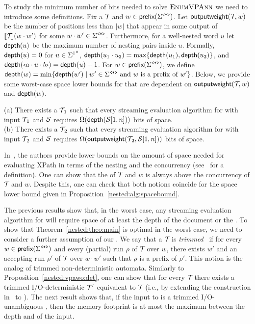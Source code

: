 To study the minimum number of bits needed to solve $\textsc{EnumVPAnn}$ we need to introduce some definitions.
Fix a \vpann $\mathcal{T}\!$ and $w \in \textsf{prefix}(\Sigma^{\texttt{<*>}})$. Let 
$\mathsf{outputweight}(\mathcal{T}\!, w)$ be the number of positions less than $|w|$ that appear in some output of ${\llbracket{\mathcal{T}\!}\rrbracket}(w\cdot w')$ for some $w\cdot w'\in \Sigma^{\texttt{<*>}}$. 
Furthermore, for a well-nested word $u$ let $\mathsf{depth}(u)$ be the maximum number of nesting pairs inside $u$. Formally, $\mathsf{depth}(u) = 0$ for $u \in  {\Sigma^{\texttt{|}}}^*$, $\mathsf{depth}(u_1 \cdot u_2) = \max\{\mathsf{depth}(u_1), \mathsf{depth}(u_2)\}$, and $\mathsf{depth}({\scriptsize\texttt{<}} a\cdot u\cdot b{\scriptsize\texttt{>}}) = \mathsf{depth}(u) + 1$. For $w \in \textsf{prefix}(\Sigma^{\texttt{<*>}})$, we define $\mathsf{depth}(w) = \min\{\mathsf{depth}(w') \mid w'\in \Sigma^{\texttt{<*>}} \text{ and } w \text{ is a prefix of } w'\}$.
Below, we provide some worst-case space lower bounds for \enumvpann{} that are dependent on $\mathsf{outputweight}(\mathcal{T}\!, w)$ and $\mathsf{depth}(w)$.
\begin{proposition}\label{nested:alg:spacebound} (a) There exists a \vpann $\mathcal{T}\!_1$ such that every streaming evaluation algorithm for \enumvpann{} with input $\mathcal{T}\!_1$ and $\mathcal{S}$ requires $\Omega(\mathsf{depth}(\mathcal{S}[1, n]))$ bits of space.\\ (b) There exists a \vpann $\mathcal{T}\!_2$ such that every streaming evaluation algorithm for \enumvpann{} with input $\mathcal{T}\!_2$ and $\mathcal{S}$ requires $\Omega(\mathsf{outputweight}(\mathcal{T}\!_2, \mathcal{S}[1, n]))$ bits of space.
\end{proposition}



In~\cite{BarYossefFJ05,BarYossefFJ07}, the authors provide lower bounds on the amount of space needed for evaluating XPath in terms of the nesting and the concurrency (see~\cite{BarYossefFJ05} for a definition). 
One can show that  the \ogapname of $\mathcal{T}\!$ and $w$ is always above the concurrency of $\mathcal{T}\!$ and $w$. Despite this, one can check that both notions coincide for the space lower bound given in Proposition~\ref{nested:alg:spacebound}.

The previous results show that, in the worst case, any streaming evaluation algorithm for \vpann will require space of at least the depth of the document or the \ogapname.
To show that Theorem~\ref{nested:theo:main} is optimal in the worst-case, we need to consider a further assumption of our \vpann. We say that a \vpann $\mathcal{T}\!$ is \emph{trimmed}~\cite{caralp2015trimming} if for every $w\in \textsf{prefix}(\Sigma^{\texttt{<*>}})$ and every (partial) run $\rho$ of $\mathcal{T}\!$ over $w$, there exists $w'$ and an accepting run $\rho'$ of $\mathcal{T}\!$ over $w \cdot w'$ such that $\rho$ is a prefix of $\rho'$. 
This notion is the analog of trimmed non-deterministic automata. Similarly to Proposition~\ref{nested:vpawo:det}, one can show that for every \vpann $\mathcal{T}\!$ there exists a trimmed I/O-deterministic \vpann $\mathcal{T}\!\,'$ equivalent to $\mathcal{T}\!$ (i.e., by extending the construction in~\cite{caralp2015trimming} to \vpann). 
The next result shows that, if the input to \enumvpann{} is a trimmed I/O-unambiguous \vpann, then the memory footprint is at most the maximum between the depth and \ogapname of the input. 

